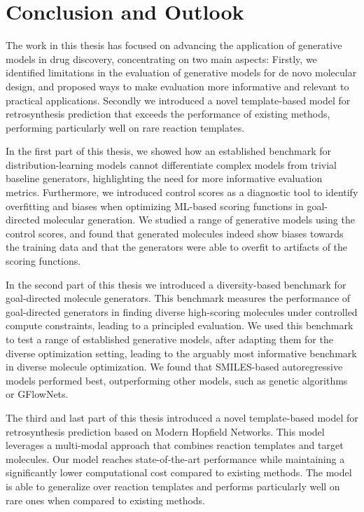 \chapter{Conclusion and Outlook\label{chap:conclusion}} The work in this thesis has focused on
advancing the application of generative models in drug discovery, concentrating on two main aspects:
Firstly, we identified limitations in the evaluation of generative models for de novo molecular
design, and proposed ways to make evaluation more informative and relevant to practical
applications. Secondly we introduced a novel template-based model for retrosynthesis prediction that
exceeds the performance of existing methods, performing particularly well on rare reaction
templates.

In the first part of this thesis, we showed how an established benchmark for
distribution-learning models cannot differentiate complex models from trivial baseline generators,
highlighting the need for more informative evaluation metrics. Furthermore, we introduced control
scores as a diagnostic tool to identify overfitting and biases when optimizing \ac{ML}-based scoring
functions in goal-directed molecular generation. We studied a range of generative models
using the control scores, and found that generated molecules indeed show biases towards the
training data and that the generators were able to overfit to artifacts of the scoring functions.

In the second part of this thesis we introduced a diversity-based benchmark for goal-directed
molecule generators. This benchmark measures the performance of goal-directed generators in finding
diverse high-scoring molecules under controlled compute constraints, leading to a principled
evaluation. We used this benchmark to test a range of established generative models, after adapting
them for the diverse optimization setting, leading to the arguably most informative benchmark in
diverse molecule optimization. We found that SMILES-based autoregressive models performed best,
outperforming other models, such as genetic algorithms or GFlowNets.

The third and last part of this thesis introduced a novel template-based model for retrosynthesis
prediction based on Modern Hopfield Networks. This model leverages a multi-modal approach that
combines reaction templates and target molecules. Our model reaches state-of-the-art performance
while maintaining a significantly lower computational cost compared to existing methods. The model
is able to generalize over reaction templates and performs particularly well on rare ones when
compared to existing methods.

